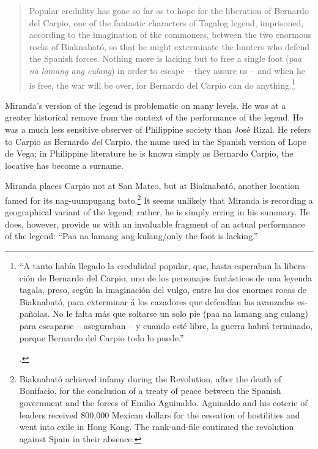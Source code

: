 \begin{quote}
Popular credulity has gone so far as to hope for the liberation of Bernardo del Carpio, one of the fantastic characters of Tagalog legend, imprisoned, according to the imagination of the commoners, between the two enormous rocks of Biaknabat\'o, so that he might exterminate the hunters who defend the Spanish forces. Nothing more is lacking but to free a single foot (\textit{paa na lamang ang culang}) in order to escape – they assure us – and when he is free, the war will be over, for Bernardo del Carpio can do anything.\footnote{\begin{otherlanguage}{spanish} \enquote{A tanto hab\'ia llegado la credulidad popular, que, hasta esperaban la liberaci\'on de Bernardo del Carpio, uno de los personajes fant\'asticos de una leyenda tagala, preso, seg\'un la imaginaci\'on del vulgo, entre las dos enormes rocas de Biaknabat\'o, para exterminar \'a los cazadores que defend\'ian las avanzadas espa\~nolas. No le falta m\'as que soltarse un solo pie (paa na lamang ang culang) para escaparse -- aseguraban -- y cuando est\'e libre, la guerra habr\'a terminado, porque Bernardo del Carpio todo lo puede.} \end{otherlanguage} \parencite[62-3]{Miranda1911}.} 
\end{quote}

Miranda's version of the legend is problematic on many levels. He was at a greater historical remove from the context of the performance of the legend. He was a much less sensitive observer of Philippine society than Jos\'e Rizal. He refers to Carpio as Bernardo \textit{del} Carpio, the name used in the Spanish version of Lope de Vega; in Philippine literature he is known simply as Bernardo Carpio, the locative has become a surname.

Miranda places Carpio not at San Mateo, but at Biaknabat\'o, another location famed for its nag-uumpugang bato.\footnote{Biaknabat\'o achieved infamy during the Revolution, after the death of Bonifacio, for the conclusion of a treaty of peace between the Spanish government and the forces of Emilio Aguinaldo. Aguinaldo and his coterie of leaders received 800,000 Mexican dollars for the cessation of hostilities and went into exile in Hong Kong. The rank-and-file continued the revolution against Spain in their absence.} It seems unlikely that Miranda is recording a geographical variant of the legend; rather, he is simply erring in his summary. He does, however, provide us with an invaluable fragment of an actual performance of the legend: \enquote{Paa na lamang ang kulang/only the foot is lacking.}


